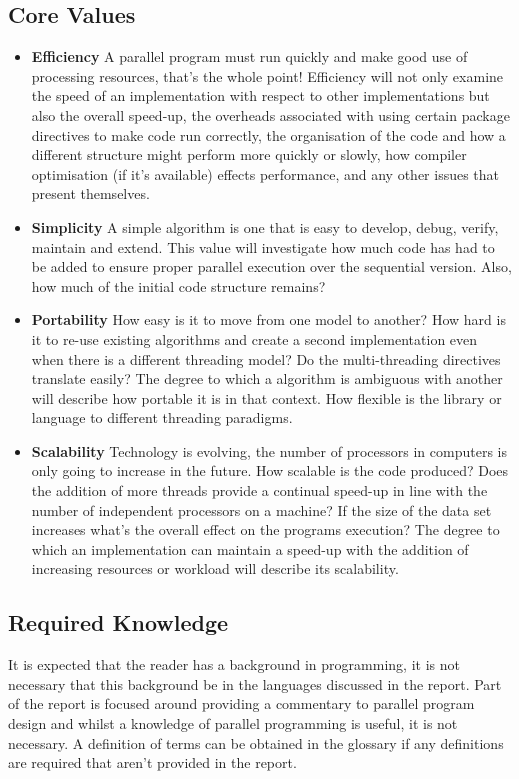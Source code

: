 \documentclass[11pt]{article} %
\begin{document}
\subsection{Core Values}
\begin{itemize}
\item {\bf Efficiency} A parallel program must run quickly and make good use of processing resources, that's the whole point! Efficiency will not only examine the speed of an implementation with respect to other implementations but also the overall speed-up, the overheads associated with using certain package directives to make code run correctly, the organisation of the code and how a different structure might perform more quickly or slowly, how compiler optimisation (if it's available) effects performance, and any other issues that present themselves.
\item {\bf Simplicity} A simple algorithm is one that is easy to develop, debug, verify, maintain and extend. This value will investigate how much code has had to be added to ensure proper parallel execution over the sequential version. Also, how much of the initial code structure remains? 
\item {\bf Portability} How easy is it to move from one model to another? How hard is it to re-use existing algorithms and create a second implementation even when there is a different threading model? Do the multi-threading directives translate easily? The degree to which a algorithm is ambiguous with another will describe how portable it is in that context. How flexible is the library or language to different threading paradigms. 
\item {\bf Scalability} Technology is evolving, the number of processors in computers is only going to increase in the future. How scalable is the code produced? Does the addition of more threads provide a continual speed-up in line with the number of independent processors on a machine? If the size of the data set increases what's the overall effect on the programs execution? The degree to which an implementation can maintain a speed-up with the addition of increasing resources or workload will describe its scalability.
\end{itemize}
\subsection{Required Knowledge}
It is expected that the reader has a background in programming, it is not necessary that this background be in the languages discussed in the report. Part of the report is focused around providing a commentary to parallel program design and whilst a knowledge of parallel programming is useful, it is not necessary. A definition of terms can be obtained in the glossary if any definitions are required that aren't provided in the report.
\end{document}
